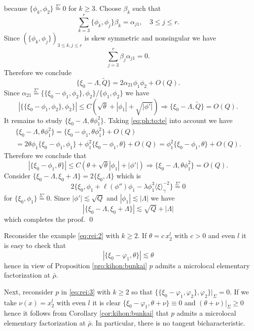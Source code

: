\documentclass[12pt,leqno]{article} %
\def\al{\alpha}
\def\be{\beta}
\def\sieq{\overset{\Sigma'}{=}}
\def\xig{\langle{\xi}\rangle_{\!\gamma}}
\def\La{\Lambda}
\def\la{\lambda}
\def\bro{\bar\rho}
\def\bro{\bar\rho}
\numberwithin{equation}{section}
\begin{document}
%
because $\{\phi_k,\phi_2\}\sieq 0$ for $k\geq 3$. Choose $\be_k$ such that
%
\[
\sum_{k=3}^r\{\phi_k,\phi_j\}\be_k=\al_{j1},\quad 3\leq j\leq r.
\]
%
Since $(\{\phi_k,\phi_j\})_{3\leq k, j\leq r}$ is skew symmetric and nonsingular we have
%
\[
\sum_{j=3}^r\be_j\al_{j1}=0.
\]
%
Therefore we conclude
%
\[
\{\xi_0-\La, \tilde Q\}=2\al_{21}\phi_1\phi_2+O(Q).
\]
%
Since $\al_{21}\sieq \{\{\xi_0-\phi_1,\phi_2\}, \phi_2\}/\{\phi_1,\phi_2\}$ we have
%
\[
|\{\{\xi_0-\phi_1,\phi_2\},\phi_2\}|\leq C(\sqrt{\theta}+|\phi_1|+\sqrt{|\phi'|})\Longrightarrow \{\xi_0-\La, \tilde Q\}=O(Q).
\]
%
It remains to study $\{\xi_0-\La, \theta\phi_1^2\}$. Taking \eqref{eq:ph:to:te} into account we have
\begin{gather*}
\{\xi_0-\La, \theta\phi_1^2\}=\{\xi_0-\phi_1, \theta\phi_1^2\}+O(Q)\\
=2\theta\phi_1\{\xi_0-\phi_1,\phi_1\}+\phi_1^2\{\xi_0-\phi_1,\theta\}+O(Q)
=\phi_1^2\{\xi_0-\phi_1,\theta\}+O(Q).
\end{gather*}
%
Therefore we conclude that
%
\[
|\{\xi_0-\phi_1,\theta\}|\leq C(\theta+\sqrt{\theta}|\phi_1|+|\phi'|)\Longrightarrow \{\xi_0-\La, \theta\phi_1^2\}=O(Q).
\]
%
Consider $\{\xi_0-\La,\xi_0+\La\}=2\{\xi_0,\La\}$ which is
%
\[
2\{\xi_0,\phi_1+\ell(\phi'')\phi_1-\la\phi_1^3\xig^{-2}\}\sieq 0
\]
%
for $\{\xi_0,\phi_1\}\sieq 0$. Since $|\phi'|\lesssim \sqrt{Q}$ and $|\phi_1|\lesssim |\La|$ we have
%
\[
|\{\xi_0-\La,\xi_0+\La\}|\lesssim \sqrt{Q}+|\La|
\]
%
which completes the proof.
\qed

\medskip

Reconsider the example \eqref{eq:rei:2} with $k\geq 2$. If $\theta=c\,x_2^l$ with $c>0$ and even $l$ it is easy to check that
%
\[
|\{\xi_0-\varphi_1,\theta\}|\lesssim \theta
\]
%
hence in view of Proposition \ref{pro:kihon:bunkai} $p$ admits a microlocal elementary factorization at $\bro$. 

Next, reconsider $p$ in \eqref{eq:rei:3} with $k\geq 2$ so that $\{\{\xi_0-\varphi_1,\varphi_2\},\varphi_2\}|_{\Sigma}=0$. If we take $\nu(x)= x_2^l$ with even $l$ it is clear $\{\xi_0-\varphi_1,\theta+\nu\}\equiv 0$ and $(\theta+\nu)|_{\Sigma}\geq 0$ hence it follows from Corollary \ref{cor:kihon:bunkai} that $p$ admits a microlocal elementary factorization at $\bro$. In particular, there is no tangent bicharacteristic. 



%


\end{document}
